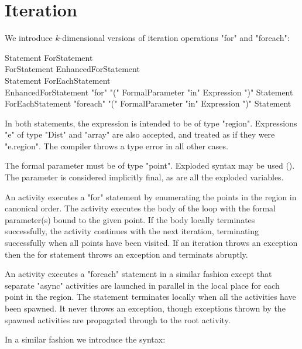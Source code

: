 {\section{Iteration}\label{ForLoop}
\label{ForAllLoop}

We introduce  $k$-dimensional versions of iteration operations \xcd"for" and 
\xcd"foreach":

\begin{grammar}
Statement \: ForStatement \\
ForStatement \: EnhancedForStatement \\
Statement \: ForEachStatement \\
EnhancedForStatement \: 
      \xcd"for" \xcd"(" FormalParameter \xcd"in" Expression \xcd")"
        Statement \\
ForEachStatement \: 
      \xcd"foreach" \xcd"(" FormalParameter \xcd"in" Expression \xcd")"
          Statement \\
\end{grammar}

In both statements, the expression is intended to be of type
\xcd"region".  Expressions \xcd"e" of type \xcd"Dist" and
\xcd"array" are also accepted, and treated as if they were \xcd"e.region".
The compiler throws a type error in all other cases.

The formal parameter must be of type \xcd"point". Exploded syntax may
be used (). The parameter is considered
implicitly final, as are all the exploded variables. 

An activity executes a \xcd"for" statement by enumerating the points
in the region in canonical order. The activity executes the body of
the loop with the formal parameter(s) bound to the given point. If the
body locally terminates successfully, the activity continues with the
next iteration, terminating successfully when all points have been
visited. If an iteration throws an exception then the for statement
throws an exception and terminats abruptly.

An activity executes a \xcd"foreach" statement in a similar fashion
except that separate \xcd"async" activities are launched in parallel
in the local place for each point in the region. The statement
terminates locally when all the activities have been spawned. It never
throws an exception, though exceptions thrown by the spawned
activities are propagated through to the root activity.

In a similar fashion we introduce the syntax:

}
